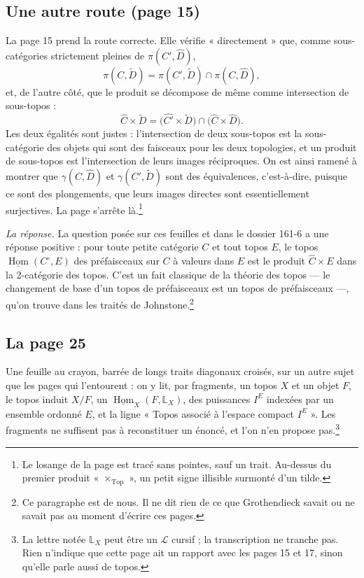 \documentclass[11pt,a4paper]{article}
\begin{document}
\subsection*{Une autre route (page 15)}

La page 15 prend la route correcte. Elle vérifie « directement » que, comme
sous-catégories strictement pleines de $\pi(C', \widehat{D})$,
\[
\pi(C, \widetilde{D}) = \pi(C', \widetilde{D}) \cap \pi(C, \widehat{D}),
\]
et, de l'autre côté, que le produit se décompose de même comme intersection de
sous-topos :
\[
\widehat{C} \times \widetilde{D} = \bigl(\widehat{C'} \times \widetilde{D}\bigr) \cap \bigl(\widehat{C} \times \widehat{D}\bigr).
\]
Les deux égalités sont justes : l'intersection de deux sous-topos est la
sous-catégorie des objets qui sont des faisceaux pour les deux topologies, et un
produit de sous-topos est l'intersection de leurs images réciproques. On est
ainsi ramené à montrer que $\gamma(C, \widehat{D})$ et
$\gamma(C', \widetilde{D})$ sont des équivalences, c'est-à-dire, puisque ce sont
des plongements, que leurs images directes sont essentiellement surjectives. La
page s'arrête là.\footnote{Le losange de la page est tracé sans pointes, sauf un
trait. Au-dessus du premier produit « $\times_{\mathrm{Top}}$ », un petit signe
illisible surmonté d'un tilde.}

\emph{La réponse.} La question posée sur ces feuilles et dans le dossier 161-6
a une réponse positive : pour toute petite catégorie $C$ et tout topos $E$, le
topos $\underline{\operatorname{Hom}}(C^{\circ}, E)$ des préfaisceaux sur $C$ à
valeurs dans $E$ est le produit $\widehat{C} \times E$ dans la 2-catégorie des
topos. C'est un fait classique de la théorie des topos --- le changement de base
d'un topos de préfaisceaux est un topos de préfaisceaux ---, qu'on trouve dans les
traités de Johnstone.\footnote{Ce paragraphe est de nous. Il ne dit rien de ce
que Grothendieck savait ou ne savait pas au moment d'écrire ces pages.}

\subsection*{La page 25}

Une feuille au crayon, barrée de longs traits diagonaux croisés, sur un autre
sujet que les pages qui l'entourent : on y lit, par fragments, un topos $X$ et un
objet $F$, le topos induit $X/F$, un
$\underline{\operatorname{Hom}}_X(F, \mathbb{L}_X)$, des puissances $I^E$ indexées
par un ensemble ordonné $E$, et la ligne « Topos associé à l'espace compact
$I^E$ ». Les fragments ne suffisent pas à reconstituer un énoncé, et l'on n'en
propose pas.\footnote{La lettre notée $\mathbb{L}_X$ peut être un $\mathcal{L}$
cursif ; la transcription ne tranche pas. Rien n'indique que cette page ait un
rapport avec les pages 15 et 17, sinon qu'elle parle aussi de topos.}
\end{document}
